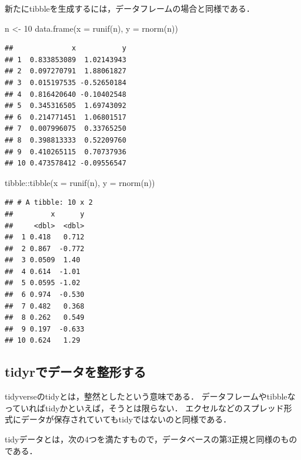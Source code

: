 \documentclass[
]{article}
\newenvironment{Shaded}{\begin{snugshade}}{\end{snugshade}}
\newcommand{\AttributeTok}[1]{\textcolor[rgb]{0.77,0.63,0.00}{#1}}
\newcommand{\DecValTok}[1]{\textcolor[rgb]{0.00,0.00,0.81}{#1}}
\newcommand{\FunctionTok}[1]{\textcolor[rgb]{0.00,0.00,0.00}{#1}}
\newcommand{\NormalTok}[1]{#1}
\newcommand{\OtherTok}[1]{\textcolor[rgb]{0.56,0.35,0.01}{#1}}
\newcommand{\SpecialCharTok}[1]{\textcolor[rgb]{0.00,0.00,0.00}{#1}}
\begin{document}
新たにtibbleを生成するには，データフレームの場合と同様である．

\begin{Shaded}
\begin{Highlighting}[]
\NormalTok{n }\OtherTok{\textless{}{-}} \DecValTok{10}
\FunctionTok{data.frame}\NormalTok{(}\AttributeTok{x =} \FunctionTok{runif}\NormalTok{(n), }\AttributeTok{y =} \FunctionTok{rnorm}\NormalTok{(n))}
\end{Highlighting}
\end{Shaded}

\begin{verbatim}
##              x           y
## 1  0.833853089  1.02143943
## 2  0.097270791  1.88061827
## 3  0.015197535 -0.52650184
## 4  0.816420640 -0.10402548
## 5  0.345316505  1.69743092
## 6  0.214771451  1.06801517
## 7  0.007996075  0.33765250
## 8  0.398813333  0.52209760
## 9  0.410265115  0.70737936
## 10 0.473578412 -0.09556547
\end{verbatim}

\begin{Shaded}
\begin{Highlighting}[]
\NormalTok{tibble}\SpecialCharTok{::}\FunctionTok{tibble}\NormalTok{(}\AttributeTok{x =} \FunctionTok{runif}\NormalTok{(n), }\AttributeTok{y =} \FunctionTok{rnorm}\NormalTok{(n))}
\end{Highlighting}
\end{Shaded}

\begin{verbatim}
## # A tibble: 10 x 2
##         x      y
##     <dbl>  <dbl>
##  1 0.418   0.712
##  2 0.867  -0.772
##  3 0.0509  1.40 
##  4 0.614  -1.01 
##  5 0.0595 -1.02 
##  6 0.974  -0.530
##  7 0.482   0.368
##  8 0.262   0.549
##  9 0.197  -0.633
## 10 0.624   1.29
\end{verbatim}

\hypertarget{tidyrux3067ux30c7ux30fcux30bfux3092ux6574ux5f62ux3059ux308b}{%
\subsection{tidyrでデータを整形する}\label{tidyrux3067ux30c7ux30fcux30bfux3092ux6574ux5f62ux3059ux308b}}

tidyverseのtidyとは，整然としたという意味である．
データフレームやtibbleなっていればtidyかといえば，そうとは限らない．
エクセルなどのスプレッド形式にデータが保存されていてもtidyではないのと同様である．

tidyデータとは，次の4つを満たすもので，データベースの第3正規と同様のものである．
\end{document}
